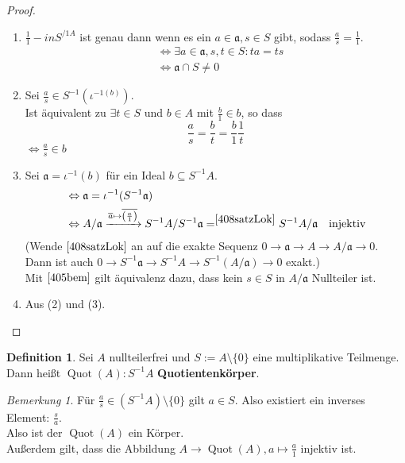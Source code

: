 \documentclass[10pt,a4paper]{article}
\newcommand{\ol}[1]{\overline{#1}}
\newcommand{\Quot}{\operatorname{Quot}}
\newcounter{thm}[section]
\theoremstyle{definition}
\newtheorem{definition}[thm]{Definition}
\theoremstyle{plain}
\theoremstyle{remark}
\newtheorem*{bem*}{Bemerkung}
\begin{document}
\begin{proof}
	\begin{enumerate}
		\item $\frac{1}{1}-in S^{/1 A}$ ist genau dann wenn es ein $a\in\mathfrak a,s\in S$ gibt, sodass $\frac{a}{s}=\frac{1}{1}$.
		\begin{align*}
		&\Leftrightarrow \exists a\in\mathfrak a,s,t\in S: ta=ts\\
		&\Leftrightarrow\mathfrak a\cap S\neq 0
		\end{align*}
		\item Sei $\frac{a}{s}\in S^{-1}(\iota^{-1(b)})$.\\
		Ist äquivalent zu $\exists t\in S$ und $b\in A$ mit $\frac{b}{1}\in b$, so dass
		\[\frac{a}{s}=\frac{b}{t}=\frac{b}{1}\frac{1}{t}\]
		$\Leftrightarrow \frac{a}{s}\in b$
		\item Sei $\mathfrak a=\iota^{-1}(b)$ für ein Ideal $b\subseteq S^{-1}A$.
		\begin{align*}
		&\Leftrightarrow\mathfrak a=\iota^{-1}(S^{-1}\mathfrak a)\\
		&\Leftrightarrow A/\mathfrak 
		a\xrightarrow{\ol{a} \mapsto \ol{\left(\frac{a}{1}\right)}}
		S^{-1}A/S^{-1}\mathfrak a=^{\ref{408satzLok}}S^{-1}A/\mathfrak a\quad\text{injektiv}
		\end{align*}
		(Wende $\ref{408satzLok}$ an auf die exakte Sequenz $0\rightarrow \mathfrak a\rightarrow A\rightarrow A/\mathfrak a\rightarrow 0$. Dann ist auch $0\rightarrow S^{-1}\mathfrak a\rightarrow S^{-1}A\rightarrow S^{-1}(A/\mathfrak a)\rightarrow 0$ exakt.)\\
		Mit $\ref{405bem}$ gilt äquivalenz dazu, dass kein $s\in S$ in $A/\mathfrak a$  Nullteiler ist.
		\item Aus (2) und (3).
	\end{enumerate}
\end{proof}

\begin{definition}
	Sei $A$ nullteilerfrei und $S:=A\setminus\{0\}$ eine multiplikative Teilmenge.\\
	Dann heißt $\Quot(A):S^{-1}A$ \textbf{Quotientenkörper}.
\end{definition}

\begin{bem*}
	Für $\frac{a}{s}\in(S^{-1}A)\setminus\{0\}$ gilt $a\in S$. Also existiert ein inverses Element: $\frac{s}{a}$.\\
	Also ist der $\Quot(A)$ ein Körper.\\
	Außerdem gilt, dass die Abbildung $A\to\Quot(A),a\mapsto \frac{a}{1}$ injektiv ist.
\end{bem*}
\end{document}
